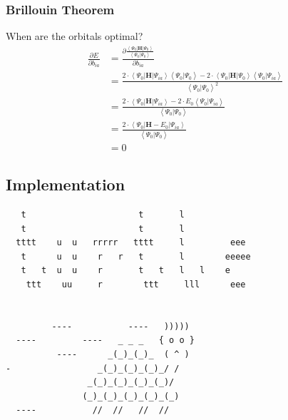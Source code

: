 \documentclass[]{beamer}
\begin{document}
\begin{frame}
  \frametitle{Brillouin Theorem}
  When are the orbitals optimal?
  \begin{equation*}
    \begin{split}
      \frac{\partial E}{\partial b_{ia}} & =\frac{\partial \frac{\left < \Psi_0 | \mathbf{H} | \Psi_0 \right >}{\left < \Psi_0 | \Psi_0 \right >}}{\partial b_{ia}}\\
      & = \frac{2 \cdot \left < \Psi_0 | \mathbf{H} | \Psi_{ia} \right > \left< \Psi_0 | \Psi_0 \right > - 2 \cdot \left < \Psi_0 | \mathbf{H} | \Psi_0  \right > \left< \Psi_0 | \Psi_{ia}\right>}{\left < \Psi_0 | \Psi_0 \right > ^2 }\\
      & = \frac{ 2 \cdot \left < \Psi_0 | \mathbf{H} | \Psi_{ia} \right > - 2 \cdot E_0 \left< \Psi_0 | \Psi_{ia} \right >}{\left < \Psi_0 | \Psi_0 \right >}\\
      & = \frac{ 2 \cdot \left < \Psi_0 | \mathbf{H} -E_0 | \Psi_{ia} \right >}{\left < \Psi_0 | \Psi_0 \right >}\\
      & = 0
    \end{split}
  \end{equation*}
\end{frame}

\subsection{Implementation}

\begin{frame}[fragile]
  \begin{verbatim}
   t                      t       l                               
   t                      t       l                               
  tttt    u  u   rrrrr   tttt     l         eee   
   t      u  u    r   r   t       l        eeeee  
   t   t  u  u    r       t   t   l   l    e      
    ttt    uu     r        ttt     lll      eee    


         ----           ----   )))))             
  ----         ----   _ _ _   { o o }     
          ----      _(_)_(_)_  ( ^ )              
-                 _(_)_(_)_(_)_/ /                        
                _(_)_(_)_(_)_(_)/                       
               (_)_(_)_(_)_(_)_(_)                     
  ----           //  //   //  //           
  \end{verbatim}
\end{frame}
\end{document}
